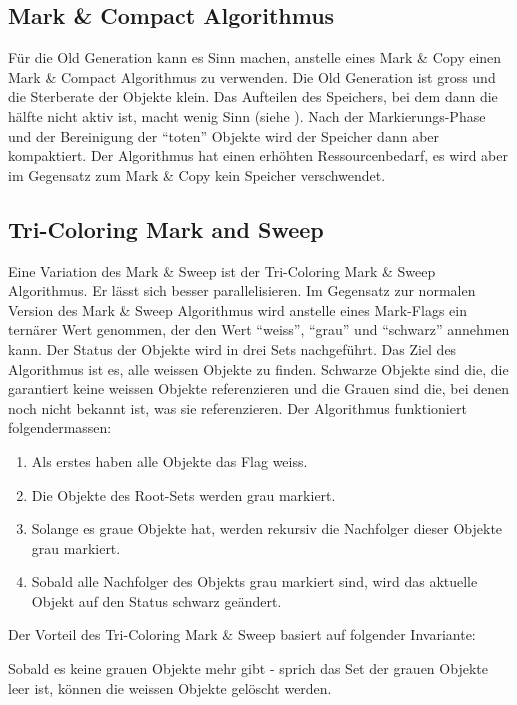 \subsection{Mark \& Compact Algorithmus}
Für die Old Generation kann es Sinn machen, anstelle eines Mark \& Copy einen Mark \& Compact Algorithmus zu verwenden. Die Old Generation ist gross und die Sterberate der Objekte klein. Das Aufteilen des Speichers, bei dem dann die hälfte nicht aktiv ist, macht wenig Sinn (siehe ). Nach der Markierungs-Phase und der Bereinigung der ``toten'' Objekte wird der Speicher dann aber kompaktiert. Der Algorithmus hat einen erhöhten Ressourcenbedarf, es wird aber im Gegensatz zum Mark \& Copy kein Speicher verschwendet. 

\subsection{Tri-Coloring Mark and Sweep}\label{tri-coloring mark and sweep}
Eine Variation des Mark \& Sweep ist der Tri-Coloring Mark \& Sweep Algorithmus. Er lässt sich besser parallelisieren\cite[S. 79]{lagergren2010oracle}. Im Gegensatz zur normalen Version des Mark \& Sweep Algorithmus wird anstelle eines Mark-Flags ein ternärer Wert genommen, der den Wert ``weiss'', ``grau'' und ``schwarz'' annehmen kann. Der Status der Objekte wird in drei Sets nachgeführt. Das Ziel des Algorithmus ist es, alle weissen Objekte zu finden. Schwarze Objekte sind die, die garantiert keine weissen Objekte referenzieren und die Grauen sind die, bei denen noch nicht bekannt ist, was sie referenzieren. Der Algorithmus funktioniert folgendermassen:

\begin{enumerate}
	\item Als erstes haben alle Objekte das Flag weiss.
	\item Die Objekte des Root-Sets werden grau markiert.
	\item Solange es graue Objekte hat, werden rekursiv die Nachfolger dieser Objekte grau markiert.
	\item Sobald alle Nachfolger des Objekts grau markiert sind, wird das aktuelle Objekt auf den Status schwarz geändert.
\end{enumerate}

Der Vorteil des Tri-Coloring Mark \& Sweep basiert auf folgender Invariante:
\begin{center}
\end{center}
Sobald es keine grauen Objekte mehr gibt - sprich das Set der grauen Objekte leer ist, können die weissen Objekte gelöscht werden.

